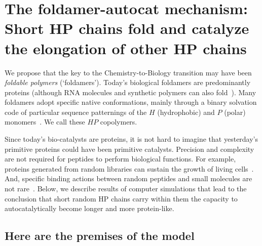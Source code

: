 \documentclass[twocolumn,letterpaper]{revtex4}
\begin{document}
\section*{The foldamer-autocat mechanism: Short HP chains fold and catalyze the elongation of other 
HP chains}

 We propose that the key to the Chemistry-to-Biology transition may have been \emph{foldable 
polymers} (`foldamers').  Today's biological foldamers are predominantly proteins (although RNA 
molecules 
and synthetic polymers can also fold~\cite{Gellman1998,Lee2005a,Capriotti2008}).  Many foldamers 
adopt specific native conformations, mainly through a binary solvation code of particular sequence 
patternings of the $H$ (hydrophobic) and $P$ (polar) monomers~\cite{Chan1991}.  We call these $HP$ 
copolymers.  

 Since today's bio-catalysts are proteins, it is not hard to imagine that yesterday's primitive 
proteins could have been primitive catalysts.  Precision and complexity are not required for 
peptides to perform biological functions. For example, proteins generated from random libraries can 
sustain the growth of living cells~\cite{Fisher2011}.  And, specific binding actions between random 
peptides and small molecules are not rare~\cite{Cherny2012}.  Below, we describe results of 
computer simulations that lead to 
the conclusion that short random HP chains carry within them the capacity to autocatalytically 
become longer and more protein-like.  

\subsection*{Here are the premises of the model}
 
\end{document}
